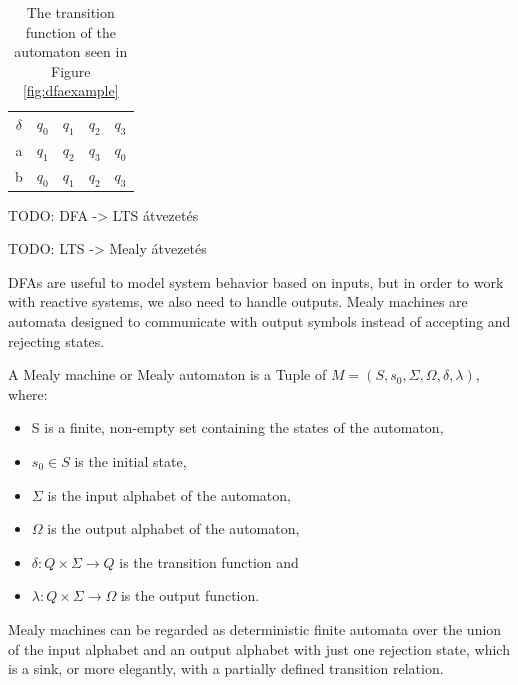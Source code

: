 \begin{table}[!ht]
	\centering
	\begin{tabular}{|c|cccc|}
		\hline
		$\delta$ & $q_0$ & $q_1$ & $q_2$ & $q_3$\\ \cline{1-5}
		a & $q_1$ & $q_2$ & $q_3$ & $q_0$ \\	
		b & $q_0$ & $q_1$ & $q_2$ & $q_3$ \\	\hline
	\end{tabular}
	\caption{The transition function of the automaton seen in Figure \ref{fig:dfaexample}}
	\label{tab:dfaexampledelta}
\end{table}

TODO: DFA -> LTS átvezetés

\begin{definition}

\end{definition}

TODO: LTS -> Mealy átvezetés

DFAs are useful to model system behavior based on inputs, but in order to work with reactive systems, we also need to handle outputs. Mealy machines are automata designed to communicate with output symbols instead of accepting and rejecting states.


\begin{definition}
	A Mealy machine or Mealy automaton is a Tuple of $ M=(S,s_{0},\Sigma,\Omega,\delta,\lambda) $, where:
	\begin{itemize}
		\item S is a finite, non-empty set containing the states of the automaton,
		\item $s_{0} \in S$ is the initial state,
		\item $\Sigma$ is the input alphabet of the automaton,
		\item $\Omega$ is the output alphabet of the automaton,
		\item $\delta: Q\times \Sigma \to Q$ is the transition function and
		\item $\lambda: Q\times \Sigma \to \Omega$ is the output function. 
	\end{itemize}
\end{definition}

Mealy machines can be regarded as deterministic finite automata over the union of the input alphabet and an output alphabet with just one rejection state, which is a sink, or more elegantly, with a partially defined transition relation.\cite{Steffen2011}

